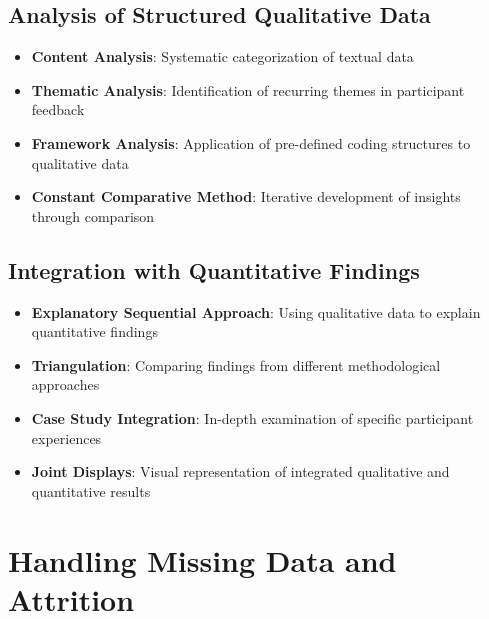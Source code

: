 \subsection{Analysis of Structured Qualitative Data}
\begin{itemize}
    \item \textbf{Content Analysis}: Systematic categorization of textual data
    
    \item \textbf{Thematic Analysis}: Identification of recurring themes in participant feedback
    
    \item \textbf{Framework Analysis}: Application of pre-defined coding structures to qualitative data
    
    \item \textbf{Constant Comparative Method}: Iterative development of insights through comparison
\end{itemize}

\subsection{Integration with Quantitative Findings}
\begin{itemize}
    \item \textbf{Explanatory Sequential Approach}: Using qualitative data to explain quantitative findings
    
    \item \textbf{Triangulation}: Comparing findings from different methodological approaches
    
    \item \textbf{Case Study Integration}: In-depth examination of specific participant experiences
    
    \item \textbf{Joint Displays}: Visual representation of integrated qualitative and quantitative results
\end{itemize}

\section{Handling Missing Data and Attrition}
